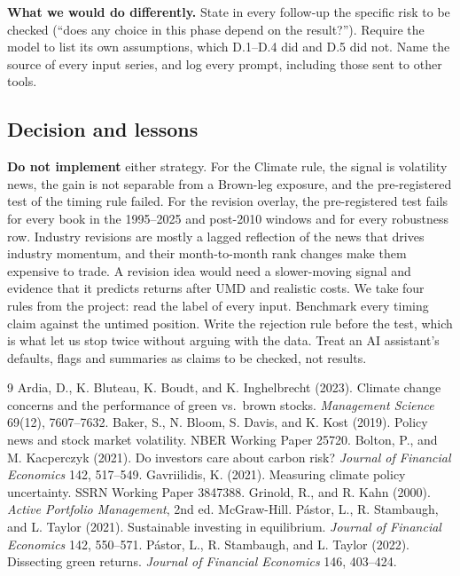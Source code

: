 \documentclass[11pt]{article}
\begin{document}
\textbf{What we would do differently.} State in every follow-up the specific risk to be checked (``does any choice in this phase depend on the result?''). Require the model to list its own assumptions, which D.1--D.4 did and D.5 did not. Name the source of every input series, and log every prompt, including those sent to other tools.

\subsection{Decision and lessons}
\label{sec:decision}

\textbf{Do not implement} either strategy. For the Climate rule, the signal is volatility news, the gain is not separable from a Brown-leg exposure, and the pre-registered test of the timing rule failed. For the revision overlay, the pre-registered test fails for every book in the 1995--2025 and post-2010 windows and for every robustness row. Industry revisions are mostly a lagged reflection of the news that drives industry momentum, and their month-to-month rank changes make them expensive to trade. A revision idea would need a slower-moving signal and evidence that it predicts returns after UMD and realistic costs. We take four rules from the project: read the label of every input. Benchmark every timing claim against the untimed position. Write the rejection rule before the test, which is what let us stop twice without arguing with the data. Treat an AI assistant's defaults, flags and summaries as claims to be checked, not results.

\begin{thebibliography}{9}\small
\setlength{\itemsep}{0pt}
 Ardia, D., K. Bluteau, K. Boudt, and K. Inghelbrecht (2023). Climate change concerns and the performance of green vs.\ brown stocks. \emph{Management Science} 69(12), 7607--7632.
 Baker, S., N. Bloom, S. Davis, and K. Kost (2019). Policy news and stock market volatility. NBER Working Paper 25720.
 Bolton, P., and M. Kacperczyk (2021). Do investors care about carbon risk? \emph{Journal of Financial Economics} 142, 517--549.
 Gavriilidis, K. (2021). Measuring climate policy uncertainty. SSRN Working Paper 3847388.
 Grinold, R., and R. Kahn (2000). \emph{Active Portfolio Management}, 2nd ed. McGraw-Hill.
 P\'astor, L., R. Stambaugh, and L. Taylor (2021). Sustainable investing in equilibrium. \emph{Journal of Financial Economics} 142, 550--571.
 P\'astor, L., R. Stambaugh, and L. Taylor (2022). Dissecting green returns. \emph{Journal of Financial Economics} 146, 403--424.
\end{thebibliography}
\end{document}
